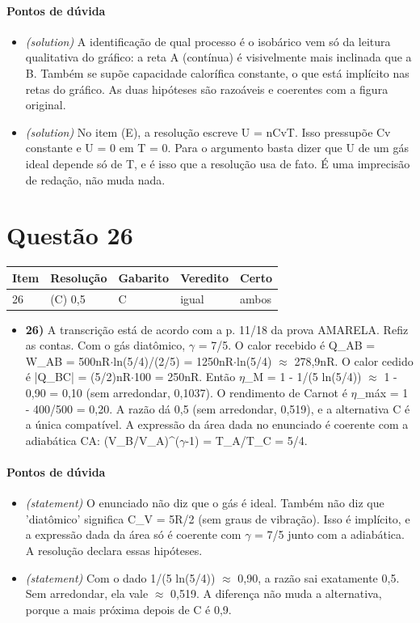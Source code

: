 \documentclass{article}%
\begin{document}
\paragraph{Pontos de dúvida}%
\begin{itemize}%
\item%
\textit{(solution)} A identificação de qual processo é o isobárico vem só da leitura qualitativa do gráfico: a reta A (contínua) é visivelmente mais inclinada que a B. Também se supõe capacidade calorífica constante, o que está implícito nas retas do gráfico. As duas hipóteses são razoáveis e coerentes com a figura original.%
\item%
\textit{(solution)} No item (E), a resolução escreve U = nCvT. Isso pressupõe Cv constante e U = 0 em T = 0. Para o argumento basta dizer que U de um gás ideal depende só de T, e é isso que a resolução usa de fato. É uma imprecisão de redação, não muda nada.%
\end{itemize}%
\section*{Questão 26}%
\begin{longtable}{@{}p{} p{} p{} p{} p{}@{}}\toprule Item & Resolução & Gabarito & Veredito & Certo \\ \midrule
26 & (C) 0,5 & C & igual & ambos \\
\bottomrule\end{longtable}%
\begin{itemize}%
\item%
\textbf{26)} A transcrição está de acordo com a p. 11/18 da prova AMARELA. Refiz as contas. Com o gás diatômico, $\gamma$ = 7/5. O calor recebido é Q\_AB = W\_AB = 500nR$\cdot$ln(5/4)/(2/5) = 1250nR$\cdot$ln(5/4) $\approx$ 278,9nR. O calor cedido é |Q\_BC| = (5/2)nR$\cdot$100 = 250nR. Então $\eta$\_M = 1 - 1/(5 ln(5/4)) $\approx$ 1 - 0,90 = 0,10 (sem arredondar, 0,1037). O rendimento de Carnot é $\eta$\_máx = 1 - 400/500 = 0,20. A razão dá 0,5 (sem arredondar, 0,519), e a alternativa C é a única compatível. A expressão da área dada no enunciado é coerente com a adiabática CA: (V\_B/V\_A)\^{}($\gamma$-1) = T\_A/T\_C = 5/4.%
\end{itemize}%
\paragraph{Pontos de dúvida}%
\begin{itemize}%
\item%
\textit{(statement)} O enunciado não diz que o gás é ideal. Também não diz que 'diatômico' significa C\_V = 5R/2 (sem graus de vibração). Isso é implícito, e a expressão dada da área só é coerente com $\gamma$ = 7/5 junto com a adiabática. A resolução declara essas hipóteses.%
\item%
\textit{(statement)} Com o dado 1/(5 ln(5/4)) $\approx$ 0,90, a razão sai exatamente 0,5. Sem arredondar, ela vale $\approx$ 0,519. A diferença não muda a alternativa, porque a mais próxima depois de C é 0,9.%
\end{itemize}%
\end{document}
